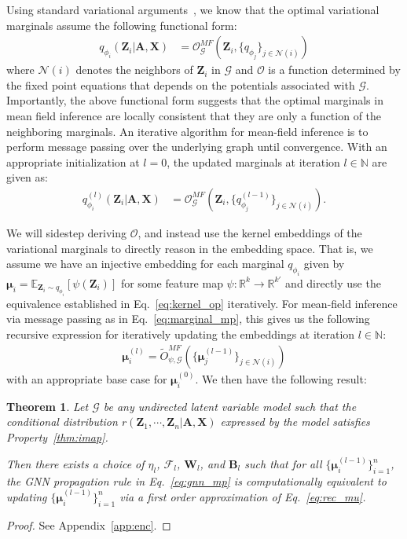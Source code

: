 \documentclass{article}
\newtheorem{theorem}{Theorem}
\begin{document}
Using standard variational arguments~\citep{wainwright2008graphical}, we know that the optimal variational marginals  assume the following functional form:
\begin{align}
q_{\phi_i}(\mathbf{Z}_i \vert \mathbf{A}, \mathbf{X}) &= \mathcal{O}^{MF}_{\mathcal{G}}\left(\mathbf{Z}_i, \{q_{\phi_j}\}_{j \in \mathcal{N}(i)}\right)
\end{align}
where $\mathcal{N}(i)$ denotes the neighbors of $\mathbf{Z}_i$ in $\mathcal{G}$ 
and $\mathcal{O}$ is a function determined by the fixed point equations that depends on the potentials associated with $\mathcal{G}$. 
Importantly, the above functional form suggests that the optimal marginals in mean field inference are locally consistent that they are only a function of the neighboring marginals.
An iterative algorithm for mean-field inference is to perform message passing over the underlying graph until convergence. With an appropriate initialization at $l=0$, the updated marginals at iteration $l\in \mathbb{N}$ are given as:
\begin{align}\label{eq:marginal_mp}
q_{\phi_i}^{(l)}(\mathbf{Z}_i \vert \mathbf{A}, \mathbf{X}) &= \mathcal{O}^{MF}_{\mathcal{G}}\left(\mathbf{Z}_i, \{q_{\phi_j}^{(l-1)}\}_{j \in \mathcal{N}(i)}\right).
\end{align}

We will sidestep deriving $\mathcal{O}$, and instead use the kernel embeddings of the variational marginals to directly reason in the embedding space. 
That is, we assume we have an injective embedding for each marginal $q_{\phi_i}$ given by $\boldsymbol{\mu}_i = \mathbb{E}_{\mathbf{Z}_i\sim q_{\phi_i}}[\psi(\mathbf{Z}_i)]$ for some feature map $\psi: \mathbb{R}^k \rightarrow\mathbb{R}^{k'} $ 
and directly use the equivalence established in Eq.~\eqref{eq:kernel_op} iteratively. For mean-field inference via message passing as in Eq.~\eqref{eq:marginal_mp}, this gives us the following recursive expression for iteratively updating the embeddings at iteration $l\in \mathbb{N}$:
\begin{align}\label{eq:rec_mu}
\boldsymbol{\mu}^{(l)}_i = \tilde{O}^{MF}_{\psi,\mathcal{G}}\left(\{\boldsymbol{\mu}^{(l-1)}_j\}_{j \in \mathcal{N}(i)}\right)
\end{align}
with an appropriate base case for  $\boldsymbol{\mu}^{(0)}_i$. 
We then have the following result:

\begin{theorem}\label{thm:gnn_imap}
Let $\mathcal{G}$ be any undirected latent variable model such that the conditional distribution $r(\mathbf{Z}_1, \cdots, \mathbf{Z}_n \vert \mathbf{A}, \mathbf{X})$ expressed by the model satisfies Property~\ref{thm:imap}. 

Then there exists a choice of $\eta_l$, $\mathcal{F}_l$, 
$\mathbf{W}_l$, 
and $\mathbf{B}_l$ such that for all $\{\boldsymbol{\mu}^{(l-1)}_i\}_{i=1}^{n}$, the GNN propagation rule in Eq.~\eqref{eq:gnn_mp} is computationally equivalent to updating $\{\boldsymbol{\mu}^{(l-1)}_i\}_{i=1}^{n}$ via a first order approximation of Eq.~\eqref{eq:rec_mu}.  
\end{theorem}
\begin{proof}
See Appendix~\ref{app:enc}.
\end{proof}
\end{document}
